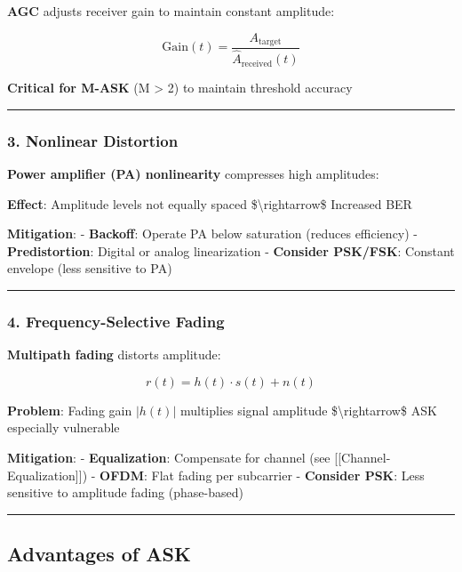 \textbf{AGC} adjusts receiver gain to maintain constant amplitude:

\[
\text{Gain}(t) = \frac{A_{\text{target}}}{\hat{A}_{\text{received}}(t)}
\]

\textbf{Critical for M-ASK} (M \textgreater{} 2) to maintain threshold
accuracy

\begin{center}\rule{0.5\linewidth}{0.5pt}\end{center}

\subsubsection{3. Nonlinear Distortion}\label{nonlinear-distortion}

\textbf{Power amplifier (PA) nonlinearity} compresses high amplitudes:

\textbf{Effect}: Amplitude levels not equally spaced
\$\textbackslash rightarrow\$ Increased BER

\textbf{Mitigation}: - \textbf{Backoff}: Operate PA below saturation
(reduces efficiency) - \textbf{Predistortion}: Digital or analog
linearization - \textbf{Consider PSK/FSK}: Constant envelope (less
sensitive to PA)

\begin{center}\rule{0.5\linewidth}{0.5pt}\end{center}

\subsubsection{4. Frequency-Selective
Fading}\label{frequency-selective-fading}

\textbf{Multipath fading} distorts amplitude:

\[
r(t) = h(t) \cdot s(t) + n(t)
\]

\textbf{Problem}: Fading gain \(|h(t)|\) multiplies signal amplitude
\$\textbackslash rightarrow\$ ASK especially vulnerable

\textbf{Mitigation}: - \textbf{Equalization}: Compensate for channel
(see {[}{[}Channel-Equalization{]}{]}) - \textbf{OFDM}: Flat fading per
subcarrier - \textbf{Consider PSK}: Less sensitive to amplitude fading
(phase-based)

\begin{center}\rule{0.5\linewidth}{0.5pt}\end{center}

\subsection{Advantages of ASK}\label{advantages-of-ask}

